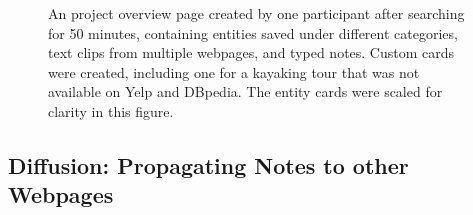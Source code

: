 
\begin{figure}
    \centering
    \caption[An project overview page created by one participant.]{An project overview page created by one participant after searching for 50 minutes, containing entities saved under different categories, text clips from multiple webpages, and typed notes. Custom cards were created, including one for a kayaking tour that was not available on Yelp and DBpedia. The entity cards were scaled for clarity in this figure.}
    \label{fig:project_fusion}
\end{figure}





\subsection{Diffusion: Propagating Notes to other Webpages}

